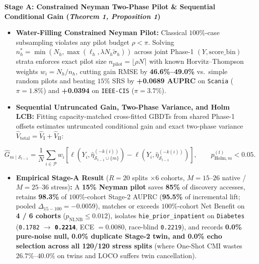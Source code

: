 \documentclass[11pt]{article}
\begin{document}
\textbf{Stage A: Constrained Neyman Two-Phase Pilot \& Sequential Conditional Gain (\emph{Theorem 1, Proposition 1})}
\begin{itemize}
  \item \textbf{Water-Filling Constrained Neyman Pilot:} Classical $100\%$-case subsampling violates any pilot budget $\rho < \pi$. Solving $n_h^* = \min(N_h, \max(\ell_h, \lambda N_h \tilde{\sigma}_h))$ across joint Phase-1 $(Y, \text{score\_bin})$ strata enforces exact pilot size $n_{\text{pilot}} = \lfloor \rho N \rceil$ with known Horvitz--Thompson weights $w_i = N_h/n_h$, cutting gain RMSE by \textbf{46.6\%--49.0\%} vs.\ simple random pilots and beating $15\%$ SRS by \textbf{+0.0689 AUPRC} on \texttt{Scania} ($\pi=1.8\%$) and \textbf{+0.0394} on \texttt{IEEE-CIS} ($\pi=3.7\%$).
  \item \textbf{Sequential Untruncated Gain, Two-Phase Variance, and Holm LCB:} Fitting capacity-matched cross-fitted GBDTs from shared Phase-1 offsets estimates untruncated conditional gain and exact two-phase variance $\widehat{V}_{\text{total}} = \widehat{V}_{\text{I}} + \widehat{V}_{\text{II}}$:
\end{itemize}
\[
  \hat{G}_{m \mid \mathcal{S}_{t-1}} = \frac{1}{N}\sum_{i \in \mathcal{P}} w_i \left[\ell\!\left(Y_i, \hat{\eta}_{\mathcal{S}_{t-1}\cup\{m\}}^{(-k(i))}\right) - \ell\!\left(Y_i, \hat{\eta}_{\mathcal{S}_{t-1}}^{(-k(i))}\right)\right], \qquad p_{\text{Holm},m}^{(t)} < 0.05.
\]
\begin{itemize}
  \item \textbf{Empirical Stage-A Result} ($R=20$ splits $\times 6$ cohorts, $M=15\text{--}26$ native / $M=25\text{--}36$ stress)\textbf{:} A \textbf{15\% Neyman pilot} saves \textbf{85\%} of discovery accesses, retains \textbf{98.3\%} of $100\%$-cohort Stage-2 AUPRC (\textbf{95.5\%} of incremental lift; pooled $\Delta_{15-100} = -0.0059$), matches or exceeds $100\%$-cohort Net Benefit on \textbf{4 / 6 cohorts} ($p_{\text{NI,NB}} \le 0.012$), isolates \texttt{hie\_prior\_inpatient} on \texttt{Diabetes} (\texttt{0.1782} $\to$ \textbf{\texttt{0.2214}}, ECE $= 0.0080$, race-blind \texttt{0.2219}), and records \textbf{0.0\% pure-noise null, 0.0\% duplicate Stage-2 twin, and 0.0\% echo selection across all 120/120 stress splits} (where One-Shot CMI wastes $26.7\%\text{--}40.0\%$ on twins and LOCO suffers twin cancellation).
\end{itemize}
\end{document}
